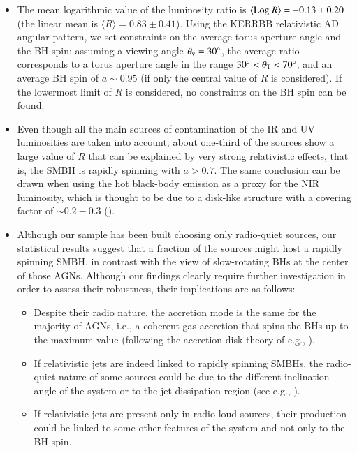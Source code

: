 \documentclass[]{aa}
\begin{document}
\begin{itemize}
    \item The mean logarithmic value of the luminosity ratio is $\langle {\rm Log}\ R \rangle = -0.13 \pm 0.20$ (the linear mean is $\langle R \rangle = 0.83 \pm 0.41$). Using the KERRBB relativistic AD angular pattern, we set constraints on the average torus aperture angle and the BH spin: assuming a viewing angle $\theta_{\rm v} = 30^{\circ}$, the average ratio corresponds to a torus aperture angle in the range $30^{\circ} < \theta_{\rm T} < 70^{\circ}$, and an average BH spin of $a \sim 0.95$ (if only the central value of $R$ is considered). If the lowermost limit of $R$ is considered, no constraints on the BH spin can be found.
    
    \item Even though all the main sources of contamination of the IR and UV luminosities are taken into account, about one-third of the sources show a large value of $R$ that can be explained by very strong relativistic effects, that is, the SMBH is rapidly spinning with $a>0.7$. The same conclusion can be drawn when using the hot black-body emission as a proxy for the NIR luminosity, which is thought to be due to a disk-like structure with a covering factor of $\sim 0.2 - 0.3$ (\citealt{Honig}).
    
	\item Although our sample has been built choosing only radio-quiet sources, our statistical results suggest that a fraction of the sources might host a rapidly spinning SMBH, in contrast with the view of slow-rotating BHs at the center of those AGNs. Although our findings clearly require further investigation in order to assess their robustness, their implications are as follows:
	\begin{itemize}
		\item Despite their radio nature, the accretion mode is the same for the majority of AGNs, i.e., a coherent gas accretion that spins the BHs up to the maximum value (following the accretion disk theory of e.g., \citealt{Thorn74}).
		\item If relativistic jets are indeed linked to rapidly spinning SMBHs, the radio-quiet nature of some sources could be due to the different inclination angle of the system or to the jet dissipation region (see e.g., \citealt{GhiTav15}).
		\item If relativistic jets are present only in radio-loud sources, their production could be linked to some other features of the system and not only to the BH spin.\\
	\end{itemize} 	
	

\end{itemize}
\end{document}
